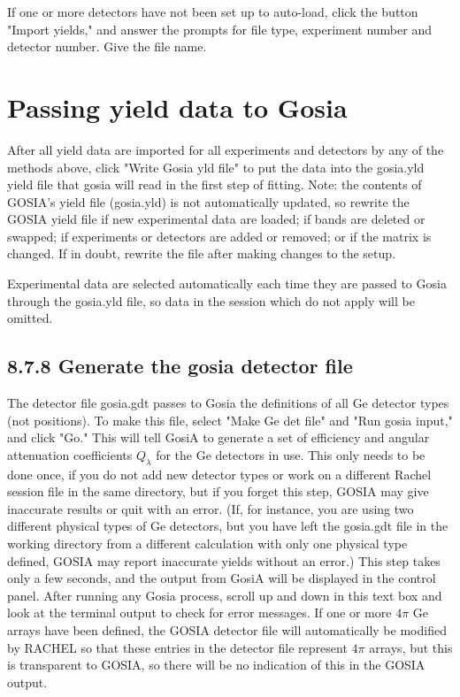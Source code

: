 \documentclass[10pt]{article}
\begin{document}
If one or more detectors have not been set up to auto-load, click the button "Import yields," and answer the prompts for file type, experiment number and detector number. Give the file name.

\section*{Passing yield data to Gosia}
After all yield data are imported for all experiments and detectors by any of the methods above, click "Write Gosia yld file" to put the data into the gosia.yld yield file that gosia will read in the first step of fitting. Note: the contents of GOSIA's yield file (gosia.yld) is not automatically updated, so rewrite the GOSIA yield file if new experimental data are loaded; if bands are deleted or swapped; if experiments or detectors are added or removed; or if the matrix is changed. If in doubt, rewrite the file after making changes to the setup.

Experimental data are selected automatically each time they are passed to Gosia through the gosia.yld file, so data in the session which do not apply will be omitted.

\subsection*{8.7.8 Generate the gosia detector file}
The detector file gosia.gdt passes to Gosia the definitions of all Ge detector types (not positions). To make this file, select "Make Ge det file" and "Run gosia input," and click "Go." This will tell GosiA to generate a set of efficiency and angular attenuation coefficients $Q_{\lambda}$ for the Ge detectors in use. This only needs to be done once, if you do not add new detector types or work on a different Rachel session file in the same directory, but if you forget this step, GOSIA may give inaccurate results or quit with an error. (If, for instance, you are using two different physical types of Ge detectors, but you have left the gosia.gdt file in the working directory from a different calculation with only one physical type defined, GOSIA may report inaccurate yields without an error.) This step takes only a few seconds, and the output from GosiA will be displayed in the control panel. After running any Gosia process, scroll up and down in this text box and look at the terminal output to check for error messages. If one or more $4 \pi$ Ge arrays have been defined, the GOSIA detector file will automatically be modified by RACHEL so that these entries in the detector file represent $4 \pi$ arrays, but this is transparent to GOSIA, so there will be no indication of this in the GOSIA output.
\end{document}
